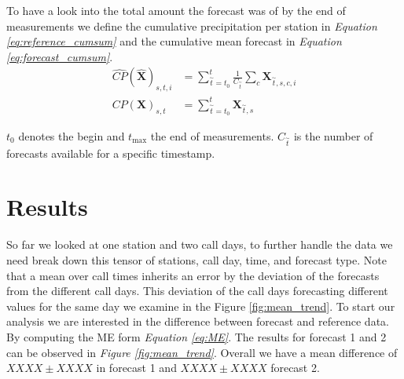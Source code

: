 \documentclass{article}
\theoremstyle{plain}
\theoremstyle{definition}
\theoremstyle{remark}
\begin{document}
To have a look into the total amount the forecast was of by the end of
measurements we define the cumulative precipitation per station in
\textit{Equation \ref{eq:reference_cumsum}} and the cumulative mean forecast in
\textit{Equation \ref{eq:forecast_cumsum}}.
\begin{align}
    \widehat{CP}(\hat{\textbf{X}})_{s, t, i} & =  \sum_{\overset{\sim}{t} =
        t_0}^{t} \frac{1}{C_{\overset{\sim}{t}}}\sum_c \textbf{X}_{\overset{\sim}{t},
    s, c,  i}
    \label{eq:forecast_cumsum}                                                      \\
    CP(\textbf{X})_{s, t}                    & = \sum_{\overset{\sim}{t} = t_0}^{t}
    \textbf{X}_{\overset{\sim}{t}, s}
    \label{eq:reference_cumsum}
\end{align}

$t_0$ denotes the begin and $t_{\max}$ the end of measurements.
$C_{\overset{\sim}{t}}$ is the number of forecasts available for a specific
timestamp.

\section{Results}\label{sec:results}



So far we looked at one station and two call days, to further handle the data
we need break down this tensor of stations, call day, time, and forecast type.
Note that a mean over call times inherits an error by the deviation of the
forecasts from the different call days. This deviation of the call days
forecasting different values for the same day we examine in the Figure
\ref{fig:mean_trend}.
To start our analysis we are interested in the difference between forecast and
reference data. By computing the ME form \textit{Equation \ref{eq:ME}}. The
results for forecast 1 and 2 can be observed in \textit{Figure
    \ref{fig:mean_trend}}. Overall we have a mean difference of $XXXX \pm XXXX$ in
forecast 1 and $XXXX \pm XXXX$	forecast 2. %
\end{document}
